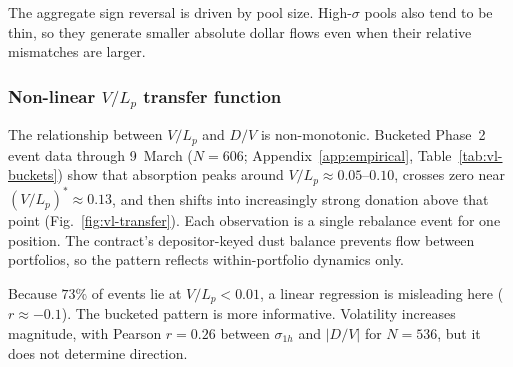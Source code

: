 \documentclass[11pt,a4paper]{article}
\theoremstyle{plain}
\begin{document}
The aggregate sign reversal is driven by pool size. High-$\sigma$ pools also tend to be thin, so they generate smaller absolute dollar flows even when their relative mismatches are larger.

\subsubsection{Non-linear $V/L_p$ transfer function}

The relationship between $V/L_p$ and $D/V$ is non-monotonic. Bucketed Phase~2 event data through 9~March ($N = 606$; Appendix~\ref{app:empirical}, Table~\ref{tab:vl-buckets}) show that absorption peaks around $V/L_p \approx 0.05$--$0.10$, crosses zero near $(V/L_p)^{*} \approx 0.13$, and then shifts into increasingly strong donation above that point (Fig.~\ref{fig:vl-transfer}). Each observation is a single rebalance event for one position. The contract's depositor-keyed dust balance prevents flow between portfolios, so the pattern reflects within-portfolio dynamics only.

Because $73\%$ of events lie at $V/L_p < 0.01$, a linear regression is misleading here ($r \approx -0.1$). The bucketed pattern is more informative. Volatility increases magnitude, with Pearson $r = 0.26$ between $\sigma_{1h}$ and $|D/V|$ for $N = 536$, but it does not determine direction.
\end{document}
